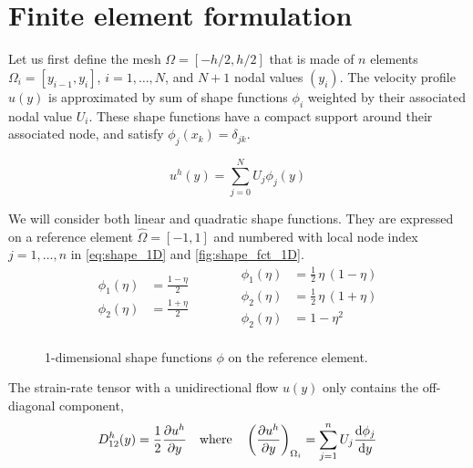 \documentclass[11 pt]{report}
\begin{document}


\section{Finite element formulation}

Let us first define the mesh $\Omega=[-h/2, h/2]$ that is made of $n$ elements $\Omega_i=[y_{i-1}, y_i]$, $i=1, \dots, N$, and $N+1$ nodal values $(y_i)$. The velocity profile $u(y)$ is approximated by sum of shape functions $\phi_i$ weighted by their associated nodal value $U_i$. These shape functions have a compact support around their associated node, and satisfy $\phi_j(x_k) = \delta_{jk}$.

\begin{equation}
        u^h(y) = \sum_{j=0}^N U_j \phi_j(y)
\end{equation}

We will consider both linear and quadratic shape functions. They are expressed on a reference element $\hat \Omega = [-1, 1]$ and numbered with local node index $j=1,\dots,n$ in \autoref{eq:shape_1D} and \autoref{fig:shape_fct_1D}.
\begin{equation}
    \begin{split}
        \phi_1(\eta) &= \frac{1-\eta}{2}\\
        \phi_2(\eta) &= \frac{1+\eta}{2}\\
    \end{split}
    \hspace{40pt}
    \begin{split}
        \phi_1(\eta) &= \frac{1}{2} \, \eta \, (1-\eta)\\
        \phi_2(\eta) &= \frac{1}{2} \, \eta \, (1+\eta)\\
        \phi_2(\eta) &= 1 - \eta^2\\
    \end{split}
    \label{eq:shape_1D}
\end{equation}

\begin{figure}[ht]
    \centering
    
    \caption{1-dimensional shape functions $\phi$ on the reference element.}
    \label{fig:shape_fct_1D}
\end{figure}


The strain-rate tensor with a unidirectional flow $u(y)$ only contains the off-diagonal component,
\begin{equation}
    D_{12}^h(y) = \frac{1}{2} \pdv{u^h}{y} \quad \text{where} \quad \left(\pdv{u^h}{y}\right)_{\Omega_i} = \sum_{j=1}^{n} U_j \dv{\phi_j}{y}
\end{equation}
\end{document}
